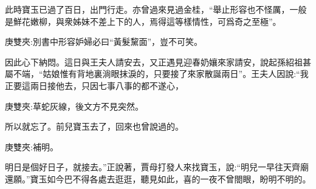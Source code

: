 \begin{parag}
    此時寶玉已過了百日，出門行走。亦曾過來見過金桂，“舉止形容也不怪厲，一般是鮮花嫩柳，與衆姊妹不差上下的人，焉得這等樣情性，可爲奇之至極”。\begin{note}庚雙夾:別書中形容妒婦必曰“黃髮黧面”，豈不可笑。\end{note}因此心下納悶。這日與王夫人請安去，又正遇見迎春奶孃來家請安，說起孫紹祖甚屬不端，“姑娘惟有背地裏淌眼抹淚的，只要接了來家散誕兩日”。王夫人因說:“我正要這兩日接他去，只因七事八事的都不遂心，\begin{note}庚雙夾:草蛇灰線，後文方不見突然。\end{note}所以就忘了。前兒寶玉去了，回來也曾說過的。\begin{note}庚雙夾:補明。\end{note}明日是個好日子，就接去。”正說著，賈母打發人來找寶玉，說:“明兒一早往天齊廟還願。”寶玉如今巴不得各處去逛逛，聽見如此，喜的一夜不曾閤眼，盼明不明的。
\end{parag}


